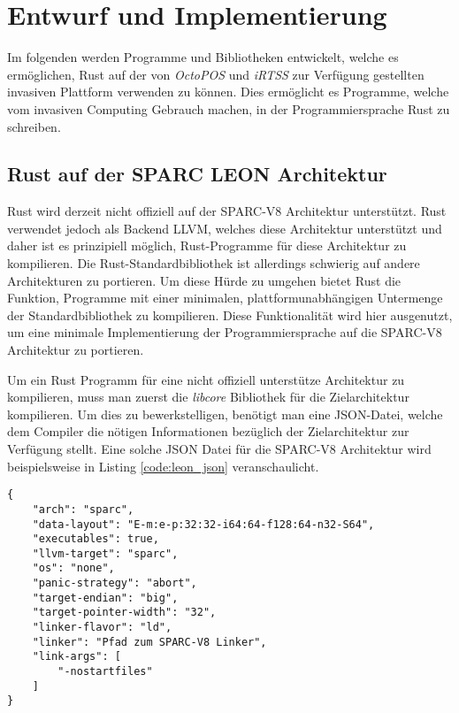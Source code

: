 \chapter{Entwurf und Implementierung}\label{sec:impl}

Im folgenden werden Programme und Bibliotheken entwickelt, welche es ermöglichen, Rust auf der von
\textit{OctoPOS} und \textit{iRTSS} zur Verfügung gestellten invasiven Plattform verwenden zu können.
Dies ermöglicht es Programme, welche vom invasiven Computing Gebrauch machen, in der
Programmiersprache Rust zu schreiben.

\section{Rust auf der SPARC LEON Architektur}\label{sec:rust_on_sparc}

Rust wird derzeit nicht offiziell auf der SPARC-V8 Architektur unterstützt. Rust verwendet jedoch als Backend LLVM,
welches diese Architektur unterstützt und daher ist es prinzipiell möglich,
Rust-Programme für diese Architektur zu kompilieren.
Die Rust-Standardbibliothek ist allerdings schwierig auf andere Architekturen zu portieren.
Um diese Hürde zu umgehen bietet Rust die Funktion,
Programme mit einer minimalen, plattformunabhängigen Untermenge der Standardbibliothek zu kompilieren.
Diese Funktionalität wird hier ausgenutzt,
um eine minimale Implementierung der Programmiersprache auf die SPARC-V8 Architektur zu portieren.

Um ein Rust Programm für eine nicht offiziell unterstütze Architektur zu kompilieren,
muss man zuerst die \textit{libcore} Bibliothek
für die Zielarchitektur kompilieren. Um dies zu bewerkstelligen, benötigt man eine JSON-Datei, welche
dem Compiler die nötigen Informationen bezüglich der Zielarchitektur zur Verfügung stellt.
Eine solche JSON Datei für die
SPARC-V8 Architektur wird beispielsweise in Listing \ref{code:leon_json} veranschaulicht.
\cite{initialSparcSupportGithub}

\begin{lstlisting}[float,caption={
Eine beispielhafte JSON-Spezifikationsdatei für die SPARC-V8 Architektur.
\cite{initialSparcSupportGithub}
},label=code:leon_json]
{
    "arch": "sparc",
    "data-layout": "E-m:e-p:32:32-i64:64-f128:64-n32-S64",
    "executables": true,
    "llvm-target": "sparc",
    "os": "none",
    "panic-strategy": "abort",
    "target-endian": "big",
    "target-pointer-width": "32",
    "linker-flavor": "ld",
    "linker": "Pfad zum SPARC-V8 Linker",
    "link-args": [
        "-nostartfiles"
    ]
}
\end{lstlisting}

